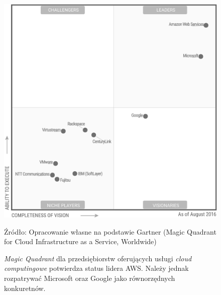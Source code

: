\documentclass[12pt,a4paper,twoside]{article}
\newcommand{\source}[1]{\caption*{\hfill Źródło: {#1}} }
\begin{document}
\begin{figure}[h]
  \centering
\includegraphics[scale=0.6]{../obrazy/fig:mquad.png}
\caption{\textit{Magic Quadrant} dla przedsiębiorstw oferujących usługi \textit{cloud computingowe} potwierdza status lidera AWS. Należy jednak rozpatrywać Microsoft oraz Google jako równorzędnych konkuretnów.\label{fig:mquad}}
\source{Opracowanie własne na podstawie Gartner (Magic Quadrant for Cloud Infrastructure as a Service, Worldwide)}
\end{figure}
\end{document}
